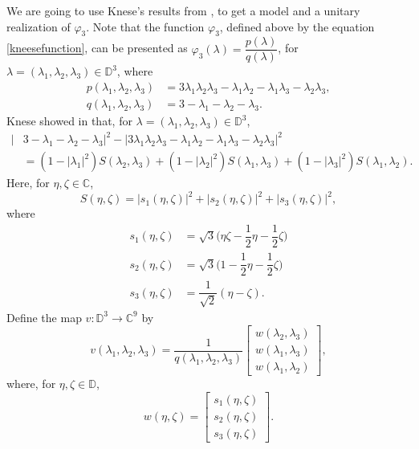 \documentclass[11pt, reqno]{amsart}
\newcommand\1{\boldsymbol {1}}
\newcommand\be{\begin{equation}}
\newcommand\ee{\end{equation}}
\newcommand{\D}{\mathbb{D}}
\numberwithin{equation}{section}
\begin{document}
We are going to use Knese's results from  \cite[Section 4]{Knese}, to get a model and a unitary realization of $\varphi_3$. Note that the function $\varphi_3$, defined above  by the equation
\eqref{kneesefunction},
can be presented as $\varphi_3(\lambda)=\dfrac{p(\lambda)}{q(\lambda)}$, for $\lambda=(\lambda_{1},\lambda_{2},\lambda_{3})\in\mathbb{D}^{3}$, where
\begin{align*}
    p(\lambda_{1},\lambda_{2},\lambda_{3}) &= 3\lambda_{1}\lambda_{2}\lambda_{3}-\lambda_{1}\lambda_{2}-\lambda_{1}\lambda_{3}-\lambda_{2}\lambda_{3}, \\
    q(\lambda_{1},\lambda_{2},\lambda_{3}) &= 3 - \lambda_{1} - \lambda_{2} -\lambda_{3}.
\end{align*}
Knese showed in \cite{Knese} that, for $\lambda=(\lambda_{1},\lambda_{2},\lambda_{3})\in\mathbb{D}^{3}$, 
\begin{align}
    \lvert &3 -\lambda_{1} - \lambda_{2} -\lambda_{3} \rvert^{2} -\lvert 3\lambda_{1}\lambda_{2}\lambda_{3}-\lambda_{1}\lambda_{2}-\lambda_{1}\lambda_{3}-\lambda_{2}\lambda_{3}\rvert^{2}\nonumber \\
    &= (1-\lvert \lambda_{1}\rvert^{2})S(\lambda_{2},\lambda_{3})+(1-\lvert \lambda_{2}\rvert^{2})S(\lambda_{1},\lambda_{3})+(1-\lvert \lambda_{3}\rvert^{2})S(\lambda_{1},\lambda_{2}).\label{kneselayout}
\end{align}
Here, for $\eta,\zeta\in\mathbb{C}$,
$$
S(\eta,\zeta) = \lvert s_{1}(\eta,\zeta)\rvert^{2}+\lvert s_{2}(\eta,\zeta) \rvert^{2}+\lvert s_{3}(\eta,\zeta)\rvert^{2},
$$
where
\begin{align*}
    s_{1}(\eta,\zeta)&=\sqrt{3}\Big(\eta \zeta-\dfrac{1}{2}\eta-\dfrac{1}{2}\zeta\Big)\\
    s_{2}(\eta,\zeta)&=\sqrt{3}\Big(1-\dfrac{1}{2}\eta-\dfrac{1}{2}\zeta\Big)\\
    s_{3}(\eta,\zeta)&=\dfrac{1}{\sqrt{2}}(\eta-\zeta).
\end{align*}
Define the map $v:\mathbb{D}^{3}\rightarrow\mathbb{C}^{9}$ by
\be\label{defv}
v(\lambda_{1},\lambda_{2},\lambda_{3})=\dfrac{1}{q(\lambda_{1},\lambda_{2},\lambda_{3})}\begin{bmatrix}
    w(\lambda_{2},\lambda_{3})\\
    w(\lambda_{1},\lambda_{3})\\
    w(\lambda_{1},\lambda_{2})
\end{bmatrix},
\ee
where, for $\eta,\zeta \in\D$,
$$
w(\eta,\zeta)=\begin{bmatrix}
    s_{1}(\eta,\zeta)\\
    s_{2}(\eta,\zeta)\\
    s_{3}(\eta,\zeta)
\end{bmatrix}.
$$
\end{document}
